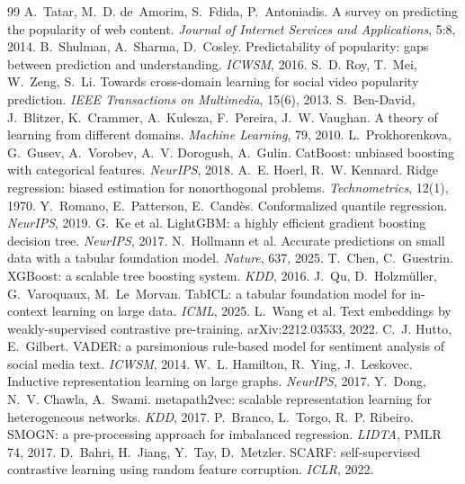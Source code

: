 \documentclass[10pt,a4paper]{article}
\begin{document}
\begin{thebibliography}{99}
 A.~Tatar, M.~D. de~Amorim, S.~Fdida, P.~Antoniadis. A survey on predicting the popularity of web
  content. \emph{Journal of Internet Services and Applications}, 5:8, 2014.
 B.~Shulman, A.~Sharma, D.~Cosley. Predictability of popularity: gaps between prediction and
  understanding. \emph{ICWSM}, 2016.
 S.~D. Roy, T.~Mei, W.~Zeng, S.~Li. Towards cross-domain learning for social video popularity
  prediction. \emph{IEEE Transactions on Multimedia}, 15(6), 2013.
 S.~Ben-David, J.~Blitzer, K.~Crammer, A.~Kulesza, F.~Pereira, J.~W. Vaughan. A theory of
  learning from different domains. \emph{Machine Learning}, 79, 2010.
 L.~Prokhorenkova, G.~Gusev, A.~Vorobev, A.~V. Dorogush, A.~Gulin. CatBoost: unbiased boosting with
  categorical features. \emph{NeurIPS}, 2018.
 A.~E. Hoerl, R.~W. Kennard. Ridge regression: biased estimation for nonorthogonal problems.
  \emph{Technometrics}, 12(1), 1970.
 Y.~Romano, E.~Patterson, E.~Cand\`es. Conformalized quantile regression. \emph{NeurIPS}, 2019.
 G.~Ke et al. LightGBM: a highly efficient gradient boosting decision tree. \emph{NeurIPS}, 2017.
 N.~Hollmann et al. Accurate predictions on small data with a tabular foundation model. \emph{Nature},
  637, 2025.
 T.~Chen, C.~Guestrin. XGBoost: a scalable tree boosting system. \emph{KDD}, 2016.
 J.~Qu, D.~Holzm\"uller, G.~Varoquaux, M.~Le~Morvan. TabICL: a tabular foundation model for in-context
  learning on large data. \emph{ICML}, 2025.
 L.~Wang et al. Text embeddings by weakly-supervised contrastive pre-training. arXiv:2212.03533, 2022.
 C.~J. Hutto, E.~Gilbert. VADER: a parsimonious rule-based model for sentiment analysis of social media
  text. \emph{ICWSM}, 2014.
 W.~L. Hamilton, R.~Ying, J.~Leskovec. Inductive representation learning on large graphs.
  \emph{NeurIPS}, 2017.
 Y.~Dong, N.~V. Chawla, A.~Swami. metapath2vec: scalable representation learning for
  heterogeneous networks. \emph{KDD}, 2017.
 P.~Branco, L.~Torgo, R.~P. Ribeiro. SMOGN: a pre-processing approach for imbalanced regression.
  \emph{LIDTA}, PMLR 74, 2017.
 D.~Bahri, H.~Jiang, Y.~Tay, D.~Metzler. SCARF: self-supervised contrastive learning using random
  feature corruption. \emph{ICLR}, 2022.
\end{thebibliography}
\end{document}
